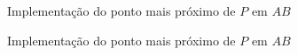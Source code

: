 \begin{frame}[fragile]{Implementação do ponto mais próximo de $P$ em $AB$}
\end{frame}

\begin{frame}[fragile]{Implementação do ponto mais próximo de $P$ em $AB$}
\end{frame}

